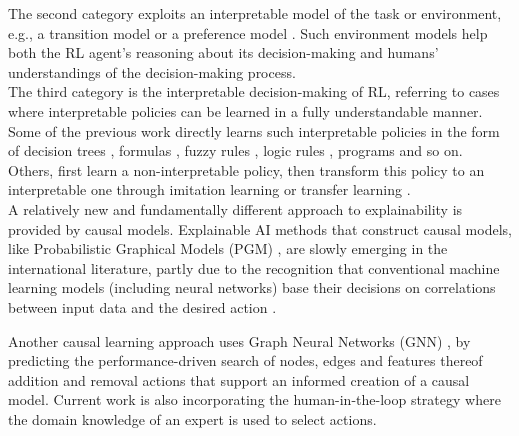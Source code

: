 \documentclass[twoside,11pt]{article}
\begin{document}
The second category exploits an interpretable model of the task or environment, e.g., a transition model \citep{martinez2016learning,zhu2020object} or a preference model \citep{toro2019learning,icarte2018using}. Such environment models help both the RL agent's reasoning about its decision-making and humans' understandings of the decision-making process.\\

The third category is the interpretable decision-making of RL, referring to cases where interpretable policies can be learned in a fully understandable manner. Some of the previous work directly learns such interpretable policies in the form of decision trees \citep{likmeta2020combining,silva2020optimization,topin2021iterative}, formulas \citep{hein2018interpretable,hein2019generating}, fuzzy rules \citep{zhang2021kogun,akrour2019towards,hein2017particle}, logic rules \citep{jiang2019neural}, programs \citep{verma2019imitation,sun2019program} and so on. Others, first learn a non-interpretable policy, then transform this policy to an interpretable one through imitation learning or transfer learning \citep{VermaEtAl:2018:ProgrammaticallyInterpretableRL,bastani2018verifiable}.\\


A relatively new and fundamentally different approach to explainability is provided by causal models. Explainable AI methods that construct causal models, like Probabilistic Graphical Models (PGM) \cite{Koller:2009:ProbabilisticGraphicalModelsBook}, \cite{Saranti:2019:LearningCompetencePGMs} are slowly emerging in the international literature, 
partly due to the recognition that conventional machine learning models (including neural networks) base their decisions on correlations between input data and the desired action  \cite{Lapuschkin:2019:UnmaskingCleverHans}. 

Another causal learning approach uses Graph Neural Networks (GNN) \cite{Vu:2020:PGMExplainer}, by predicting the performance-driven search of nodes, edges and features thereof addition and removal actions that support an informed creation of a causal model. Current work is also incorporating the human-in-the-loop strategy \cite{Holzinger:2016:iML} where the domain knowledge of an expert is used to select actions. 
\end{document}
